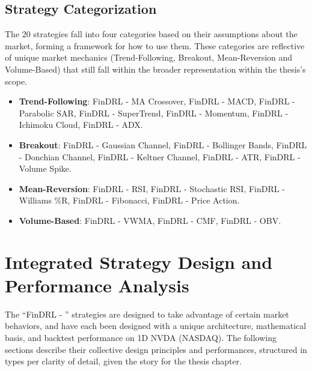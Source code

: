 


\subsection{Strategy Categorization}
The 20 strategies fall into four categories based on their assumptions about the market, forming a framework for how to use them. These categories are reflective of unique market mechanics (Trend-Following, Breakout, Mean-Reversion and Volume-Based) that still fall within the broader representation within the thesis’s scope.


\begin{itemize}
    \item \textbf{Trend-Following}: FinDRL - MA Crossover, FinDRL - MACD, FinDRL - Parabolic SAR, FinDRL - SuperTrend, FinDRL - Momentum, FinDRL - Ichimoku Cloud, FinDRL - ADX.
    \item \textbf{Breakout}: FinDRL - Gaussian Channel, FinDRL - Bollinger Bands, FinDRL - Donchian Channel, FinDRL - Keltner Channel, FinDRL - ATR, FinDRL - Volume Spike.
    \item \textbf{Mean-Reversion}: FinDRL - RSI, FinDRL - Stochastic RSI, FinDRL - Williams \%R, FinDRL - Fibonacci, FinDRL - Price Action.
    \item \textbf{Volume-Based}: FinDRL - VWMA, FinDRL - CMF, FinDRL - OBV.
\end{itemize}

\section{Integrated Strategy Design and Performance Analysis}
The “FinDRL - ” strategies are designed to take advantage of certain market behaviors, and have each been designed with a unique architecture, mathematical basis, and backtest performance on 1D NVDA (NASDAQ). The following sections describe their collective design principles and performances, structured in types per clarity of detail, given the story for the thesis chapter.

